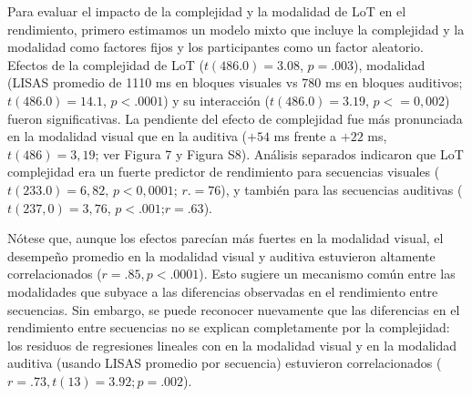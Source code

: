 Para evaluar el impacto de la complejidad y la modalidad de LoT en el rendimiento, primero estimamos un modelo mixto que incluye la complejidad y la modalidad como factores fijos y los participantes como un factor aleatorio. Efectos de la complejidad de LoT ($t (486.0) = 3.08$, $p = .003$), modalidad (LISAS promedio de 1110 ms en bloques visuales vs 780 ms en bloques auditivos; $t (486.0) = 14.1$, $p < .0001$) y su interacción ($t (486.0) = 3.19$, $p< = 0,002$) fueron significativas. La pendiente del efecto de complejidad fue más pronunciada en la modalidad visual que en la auditiva ($+54$ ms frente a $+22$ ms, $t (486) = 3,19$; ver Figura 7 y Figura S8). Análisis separados indicaron que LoT complejidad era un fuerte predictor de rendimiento para secuencias visuales ($t (233.0) = 6,82$, $p <0,0001$; $r. = 76$), y también para las secuencias auditivas ($t (237,0) = 3,76$, $p < . 001$;$ r = .63$).


Nótese que, aunque los efectos parecían más fuertes en la modalidad visual, el desempeño promedio en la modalidad visual y auditiva estuvieron altamente correlacionados ($r = .85, p < .0001$). Esto sugiere un mecanismo común entre las modalidades que subyace a las diferencias observadas en el rendimiento entre secuencias. Sin embargo, se puede reconocer nuevamente que las diferencias en el rendimiento entre secuencias no se explican completamente por la complejidad: los residuos de regresiones lineales con \mdlbin en la modalidad visual y en la modalidad auditiva (usando LISAS promedio por secuencia) estuvieron correlacionados ($r = .73, t (13) = 3.92; p = .002$).


